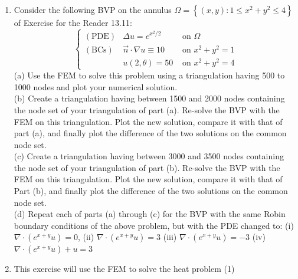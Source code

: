 \documentclass[../main.tex]{subfiles}
\begin{document}
\begin{enumerate}
(c) Create a triangulation having between 3000 and 3500 nodes containing the node set of your triangulation of part (b). Re-solve the BVP with the FEM on this triangulation. Plot the new solution, compare it with that of part (b), and finally plot the difference of the two solutions on the common node set.\\
(d) Repeat each of parts (a) through (c) for the BVP with the same Robin boundary conditions of the above problem, but with the PDE changed to:\\
(i) $\nabla \cdot\left(e^{x+y} u\right)=0$,
(ii) $\nabla \cdot\left(e^{x+y} u\right)=3$,
(iii) $\nabla \cdot\left(e^{x+y} u\right)=-3$,
(iv) $-\nabla \cdot\left(e^{x+y} u\right)+u=3$

	\item Consider the following BVP on the annulus $\Omega=\left\{(x, y): 1 \leq x^{2}+y^{2} \leq 4\right\}$ of Exercise for the Reader 13.11:
	$$
\left\{\begin{array}{ccc}
(\mathrm{PDE}) & \Delta u=e^{x^{2} / 2} & \text { on } \Omega \\
(\mathrm{BCs}) & \vec{n} \cdot \nabla u \equiv 10 & \text { on } x^{2}+y^{2}=1 \\
& u(2, \theta)=50 & \text { on } x^{2}+y^{2}=4
\end{array}\right.
$$
(a) Use the FEM to solve this problem using a triangulation having 500 to 1000 nodes and plot 
your numerical solution.\\ 
(b) Create a triangulation having between 1500 and 2000 nodes containing the node set of your 
triangulation of part (a). Re-solve the BVP with the FEM on this triangulation. Plot the new 
solution, compare it with that of part (a), and finally plot the difference of the two solutions on 
the common node set. \\
(c) Create a triangulation having between 3000 and 3500 nodes containing the node set of your 
triangulation of part (b). Re-solve the BVP with the FEM on this triangulation. Plot the new 
solution, compare it with that of Part (b), and finally plot the difference of the two solutions on 
the common node set. \\
(d) Repeat each of parts (a) through (c) for the BVP with the same Robin boundary conditions 
of the above problem, but with the PDE changed to: 
(i) $\nabla \cdot\left(e^{x+y} u\right)=0$,
(ii) $\nabla \cdot\left(e^{x+y} u\right)=3$
(iii) $\nabla \cdot\left(e^{x+y} u\right)=-3$
(iv) $\nabla \cdot\left(e^{x+y} u\right)+u=3$
	\item This exercise will use the FEM to solve the heat problem (1) 

\end{enumerate}
\end{document}
